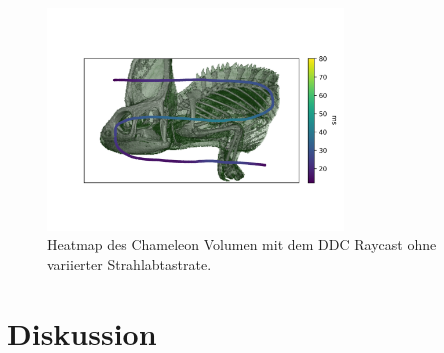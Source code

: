 \begin{figure}
	\centering
	\includegraphics[width=0.7\textwidth]{../../Neue_Messungen/Chameleon/heatmaps/ms_data_ddc_rORS_chameleon_heatmap.png}
	\caption{Heatmap des Chameleon Volumen mit dem DDC Raycast ohne variierter Strahlabtastrate.}
	\label{fig::res::pf::hm_ddc_ors}
\end{figure}

\cleardoublepage

\section*{Diskussion}\label{sec::disc}

